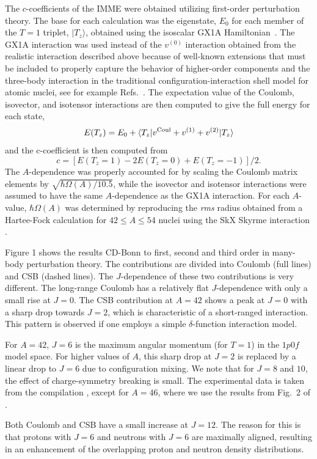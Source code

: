 \documentclass[10pt,showpacs,preprintnumbers,footinbib,amsmath,amssymb,aps,prl,twocolumn,groupedaddress,superscriptaddress,showkeys]{revtex4-1}
\begin{document}
The $c$-coefficients of the IMME were obtained utilizing first-order
perturbation theory. The base for each calculation was the eigenstate,
$E_{0}$ for each member of the $T=1$ triplet, $ \vert T_{z} \rangle$,
obtained using the isoscalar GX1A Hamiltonian~\cite{ref:GX1A}. The
GX1A interaction was used instead of the $v^{(0)}$ interaction
obtained from the realistic interaction described above because of
well-known extensions that must be included to properly capture the
behavior of higher-order components and the three-body interaction in
the traditional configuration-interaction shell model for atomic
nuclei, see for example Refs.~\cite{zuker2003,ekstrom2015}. The expectation value of the Coulomb,
isovector, and isotensor interactions are then computed to give the
full energy for each state,
\[
E(T_{z}) = E_{0} + \langle T_{z} \vert   v^{{\rm Coul}} + v^{(1)} + v^{(2)}\vert T_{z} \rangle
\]
and the c-coefficient is then computed from
\[
c = [E(T_{z} =1) - 2E(T_{z} =0) + E(T_{z} =-1)]/2.
\]
The $A$-dependence was properly accounted for by scaling the Coulomb
matrix elements by $ \sqrt{\hbar\Omega(A)/10.5} $, while the isovector
and isotensor interactions were assumed to have the same
$A$-dependence as the GX1A interaction. For each $A$-value,
$\hbar\Omega(A)$ was determined by reproducing the {\it rms} radius
obtained from a Hartee-Fock calculation for $42 \le A\le 54$ nuclei
using the SkX Skyrme interaction \cite{ref:SkX}.

Figure 1 shows the results CD-Bonn to first, second and third order in many-body perturbation theory.
The contributions are divided into Coulomb (full lines) and CSB
(dashed lines). The $J$-dependence of these two contributions is very
different. The long-range Coulomb has a relatively flat $J$-dependence
with only a small rise at $J=0$. The CSB contribution at $A=42$ shows
a peak at $J=0$ with a sharp drop towards $J=2$, which is
characteristic of a short-ranged interaction.  
This pattern is observed if one employs a simple $\delta$-function interaction model.

For $A=42$, $J=6$ is
the maximum angular momentum (for $T=1$) in the $1p0f$ model space.
For higher values of $A$, this sharp drop at $ J=2 $ is replaced by a
linear drop to $J=6$ due to configuration mixing.  We note that for
$J=8$ and $10$, the effect of charge-symmetry breaking is small. The
experimental data is taken from the compilation \cite{2013la}, except
for $A=46$, where we use the results from Fig.~2 of \cite{2001ga}.

Both Coulomb and CSB have a small increase at $J=12$.
The reason for this is that
protons with $J=6$ and neutrons with $J=6$
are maximally aligned, resulting in an enhancement of the
overlapping proton and neutron density distributions.
\end{document}
